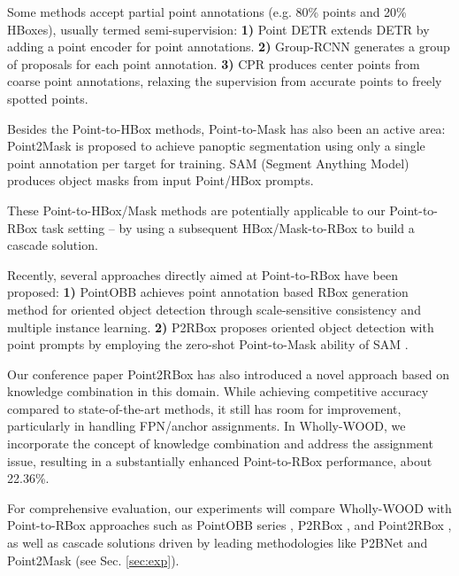 Some methods accept partial point annotations (e.g. 80\% points and 20\% HBoxes), usually termed semi-supervision: 
\textbf{1)} Point DETR \cite{chen2021points} extends DETR \cite{carion2020detr} by adding a point encoder for point annotations. 
\textbf{2)} Group-RCNN \cite{zhang2022grouprcnn} generates a group of proposals for each point annotation.
\textbf{3)} CPR \cite{yu2022object} produces center points from coarse point annotations, relaxing the supervision from accurate points to freely spotted points.

Besides the Point-to-HBox methods, Point-to-Mask has also been an active area: Point2Mask \cite{li2023point2mask} is proposed to achieve panoptic segmentation using only a single point annotation per target for training. SAM (Segment Anything Model) \cite{kirillov2023segany} produces object masks from input Point/HBox prompts.

These Point-to-HBox/Mask methods are potentially applicable to our Point-to-RBox task setting -- by using a subsequent HBox/Mask-to-RBox to build a cascade solution. 

Recently, several approaches directly aimed at Point-to-RBox have been proposed: \textbf{1)} PointOBB \cite{luo2024pointobb} achieves point annotation based RBox generation method for oriented object detection through scale-sensitive consistency and multiple instance learning. \textbf{2)} P2RBox \cite{cao2023p2rbox} proposes oriented object detection with point prompts by employing the zero-shot Point-to-Mask ability of SAM \cite{kirillov2023segany}.

Our conference paper Point2RBox \cite{yu2024point2rbox} has also introduced a novel approach based on knowledge combination in this domain. While achieving competitive accuracy compared to state-of-the-art methods, it still has room for improvement, particularly in handling FPN/anchor assignments. In Wholly-WOOD, we incorporate the concept of knowledge combination and address the assignment issue, resulting in a substantially enhanced Point-to-RBox performance, about 22.36\%.

For comprehensive evaluation, our experiments will compare Wholly-WOOD with Point-to-RBox approaches such as PointOBB series \cite{luo2024pointobb,ren2025pointobbv2}, P2RBox \cite{cao2023p2rbox}, and Point2RBox \cite{yu2024point2rbox}, as well as cascade solutions driven by leading methodologies like P2BNet \cite{chen2022pointtobox} and Point2Mask \cite{li2023point2mask} (see Sec. \ref{sec:exp}).